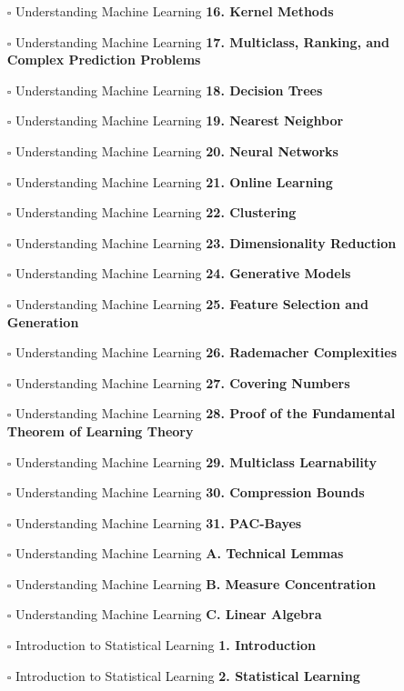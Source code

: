 \documentclass[a4, landscape, 12pt]{article}
\newcommand{\checkbox}{$\square$}%
\begin{document}
\begin{itemize}
{}
\item [\checkbox]  Understanding Machine Learning \textbf{ 16. Kernel Methods
}
\item [\checkbox]  Understanding Machine Learning \textbf{ 17. Multiclass, Ranking, and Complex Prediction Problems
}
\item [\checkbox]  Understanding Machine Learning \textbf{ 18. Decision Trees
}
\item [\checkbox]  Understanding Machine Learning \textbf{ 19. Nearest Neighbor
}
\item [\checkbox]  Understanding Machine Learning \textbf{ 20. Neural Networks
}
\item [\checkbox]  Understanding Machine Learning \textbf{ 21. Online Learning
}
\item [\checkbox]  Understanding Machine Learning \textbf{ 22. Clustering
}
\item [\checkbox]  Understanding Machine Learning \textbf{ 23. Dimensionality Reduction
}
\item [\checkbox]  Understanding Machine Learning \textbf{ 24. Generative Models
}
\item [\checkbox]  Understanding Machine Learning \textbf{ 25. Feature Selection and Generation
}
\item [\checkbox]  Understanding Machine Learning \textbf{ 26. Rademacher Complexities
}
\item [\checkbox]  Understanding Machine Learning \textbf{ 27. Covering Numbers
}
\item [\checkbox]  Understanding Machine Learning \textbf{ 28. Proof of the Fundamental Theorem of Learning Theory
}
\item [\checkbox]  Understanding Machine Learning \textbf{ 29. Multiclass Learnability
}
\item [\checkbox]  Understanding Machine Learning \textbf{ 30. Compression Bounds
}
\item [\checkbox]  Understanding Machine Learning \textbf{ 31. PAC-Bayes
}
\item [\checkbox]  Understanding Machine Learning \textbf{ A. Technical Lemmas
}
\item [\checkbox]  Understanding Machine Learning \textbf{ B. Measure Concentration
}
\item [\checkbox]  Understanding Machine Learning \textbf{ C. Linear Algebra
}
\item [\checkbox]  Introduction to Statistical Learning \textbf{ 1. Introduction
}
\item [\checkbox]  Introduction to Statistical Learning \textbf{ 2. Statistical Learning
}
\end{itemize}
\end{document}
